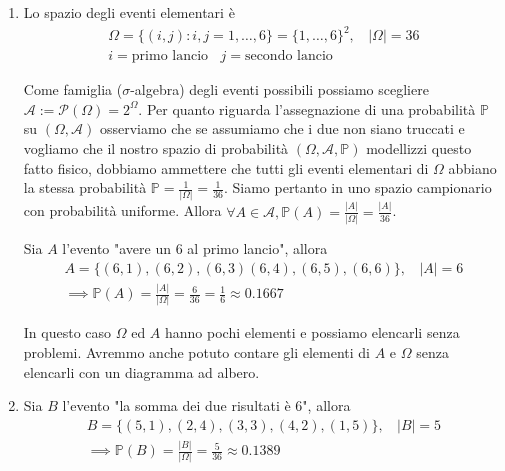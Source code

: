 \Soluzione
\begin{enumerate}
\item Lo spazio degli eventi elementari è\begin{gather*}
\Omega =\{( i,j) :i,j=1,\dotsc ,6\} =\{1,\dotsc ,6\}^{2} ,\ \ \ \ | \Omega | =36\\
i=\text{primo lancio} \ \ \ \ j=\text{secondo lancio}
\end{gather*}

Come famiglia ($\sigma $-algebra) degli eventi possibili possiamo scegliere $\mathcal{A} :=\mathcal{P}( \Omega ) =2^{\Omega }$. Per quanto riguarda l'assegnazione di una probabilità $\mathbb{P}$ su $( \Omega ,\mathcal{A})$ osserviamo che se assumiamo che i due non siano truccati e vogliamo che il nostro spazio di probabilità $( \Omega ,\mathcal{A} ,\mathbb{P})$ modellizzi questo fatto fisico, dobbiamo ammettere che tutti gli eventi elementari di $\Omega $ abbiano la stessa probabilità $\mathbb{P} =\frac{1}{| \Omega | } =\frac{1}{36}$. Siamo pertanto in uno spazio campionario con probabilità uniforme. Allora $\forall A\in \mathcal{A} ,\mathbb{P}( A) =\frac{| A| }{| \Omega | } =\frac{| A| }{36}$.

Sia $A$ l'evento "avere un $6$ al primo lancio", allora\begin{gather*}
A=\{( 6,1) ,( 6,2) ,( 6,3)( 6,4) ,( 6,5) ,( 6,6)\} ,\ \ \ \ | A| =6\\
\mathbb{\implies P}( A) =\frac{| A| }{| \Omega | } =\frac{6}{36} =\frac{1}{6} \approx 0.1667
\end{gather*}

\begin{oss}
In questo caso $\Omega $ ed $A$ hanno pochi elementi e possiamo elencarli senza problemi. Avremmo anche potuto contare gli elementi di $A$ e $\Omega $ senza elencarli con un diagramma ad albero.
\end{oss}
\item Sia $B$ l'evento "la somma dei due risultati è $6$", allora\begin{gather*}
B=\{( 5,1) ,( 2,4) ,( 3,3) ,( 4,2) ,( 1,5)\} ,\ \ \ \ | B| =5\\
\mathbb{\implies P}( B) =\frac{| B| }{| \Omega | } =\frac{5}{36} \approx 0.1389
\end{gather*}


\end{enumerate}
